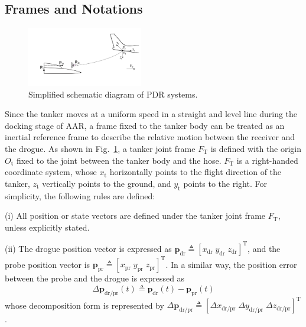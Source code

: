 \subsection{Frames and Notations}

\begin{figure}[tbh]
	\centering \includegraphics[width=0.45\textwidth]{Figures/Figs_Ch9/OverViewAAR}
	\caption{Simplified schematic diagram of PDR systems.}
	\label{Fig_OverViewAAR} 
\end{figure}

Since the tanker moves at a uniform speed in a straight and level
line during the docking stage of AAR, a frame fixed to the tanker
body can be treated as an inertial reference frame to describe the
relative motion between the receiver and the drogue. As shown in Fig.~\ref{Fig_OverViewAAR},
a tanker joint frame $F_{\text{T}}$ is defined with the origin $O_{\text{t}}$
fixed to the joint between the tanker body and the hose. $F_{\text{T}}$
is a right-handed coordinate system, whose $x_{\text{t}}$ horizontally
points to the flight direction of the tanker, $z_{\text{t}}$ vertically
points to the ground, and $y_{\text{t}}$ points to the right. For
simplicity, the following rules are defined:

(i) All position or state vectors are defined under the tanker joint
frame $F_{\text{T}}$, unless explicitly stated.

(ii) The drogue position vector is expressed as ${\mathbf{p}}_{\text{dr}}\triangleq\left[x_{\text{dr}}\;y_{\text{dr}}\;z_{\text{dr}}\right]^{\text{T}}$,
and the probe position vector is ${\mathbf{p}}_{\text{pr}}\triangleq\left[x_{\text{pr}}\;y_{\text{pr}}\;z_{\text{pr}}\right]^{\text{T}}$.
In a similar way, the position error between the probe and the drogue
is expressed as
\begin{equation}
\Delta{\mathbf{p}}_{\text{dr/pr}}\left(t\right)\triangleq{\mathbf{p}}_{\text{dr}}\left(t\right)-{\mathbf{p}}_{\text{pr}}\left(t\right)\label{Eq-1-1}
\end{equation}
whose decomposition form is represented by $\Delta{\mathbf{p}}_{\text{dr/pr}}\triangleq[\Delta x_{\text{dr/pr}}\;\Delta y_{\text{dr/pr}}\;\Delta z_{\text{dr/pr}}]^{\text{T}}$
.

